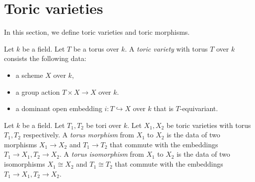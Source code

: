 \section{Toric varieties}


In this section, we define toric varieties and toric morphisms.


\begin{definition}
  \label{5-1-tor-var}
  \leanok

  Let $k$ be a field.
  Let $T$ be a torus over $k$.
  A \emph{toric variety} with torus $T$ over $k$ consists the following data:
  \begin{itemize}
    \item a scheme $X$ over $k$,
    \item a group action $T \times X \to X$ over $k$.
    \item a dominant open embedding $i : T \hookrightarrow X$ over $k$ that is $T$-equivariant.
  \end{itemize}
\end{definition}


\begin{definition}
  \label{5-1-tor-hom}
  \leanok

  Let $k$ be a field.
  Let $T_1, T_2$ be tori over $k$.
  Let $X_1, X_2$ be toric varieties with torus $T_1, T_2$ respectively.
  A \emph{torus morphism} from $X_1$ to $X_2$ is the data of two morphisms $X_1 \to X_2$ and
  $T_1 \to T_2$ that commute with the embeddings $T_1 \to X_1, T_2 \to X_2$.
  A \emph{torus isomorphism} from $X_1$ to $X_2$ is the data of two isomorphisms $X_1 \cong X_2$ and
  $T_1 \cong T_2$ that commute with the embeddings $T_1 \to X_1, T_2 \to X_2$.
\end{definition}
